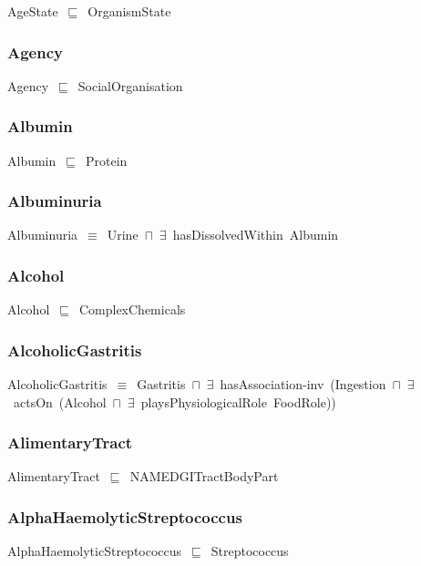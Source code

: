 \documentclass{article}
\begin{document}
AgeState~\ensuremath{\sqsubseteq}~OrganismState~

\subsubsection*{Agency}

Agency~\ensuremath{\sqsubseteq}~SocialOrganisation~

\subsubsection*{Albumin}

Albumin~\ensuremath{\sqsubseteq}~Protein~

\subsubsection*{Albuminuria}

Albuminuria~\ensuremath{\equiv}~Urine~\ensuremath{\sqcap}~\ensuremath{\exists}~hasDissolvedWithin~Albumin

\subsubsection*{Alcohol}

Alcohol~\ensuremath{\sqsubseteq}~ComplexChemicals~

\subsubsection*{AlcoholicGastritis}

AlcoholicGastritis~\ensuremath{\equiv}~Gastritis~\ensuremath{\sqcap}~\ensuremath{\exists}~hasAssociation-inv~(Ingestion~\ensuremath{\sqcap}~\ensuremath{\exists}~actsOn~(Alcohol~\ensuremath{\sqcap}~\ensuremath{\exists}~playsPhysiologicalRole~FoodRole))

\subsubsection*{AlimentaryTract}

AlimentaryTract~\ensuremath{\sqsubseteq}~NAMEDGITractBodyPart~

\subsubsection*{AlphaHaemolyticStreptococcus}

AlphaHaemolyticStreptococcus~\ensuremath{\sqsubseteq}~Streptococcus~
\end{document}
